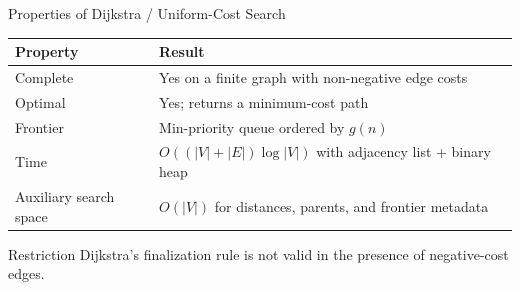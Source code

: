 \documentclass[aspectratio=169,10pt]{beamer}
\begin{document}
\begin{frame}[shrink=20]{Properties of Dijkstra / Uniform-Cost Search}
  \begin{center}
  \renewcommand{\arraystretch}{1.32}
  \begin{tabular}{l|l}
    \textbf{Property} & \textbf{Result} \\\hline
    Complete & Yes on a finite graph with non-negative edge costs \\
    Optimal & Yes; returns a minimum-cost path \\
    Frontier & Min-priority queue ordered by $g(n)$ \\
    Time & $O((|V|+|E|)\log |V|)$ with adjacency list + binary heap \\
    Auxiliary search space & $O(|V|)$ for distances, parents, and frontier metadata
  \end{tabular}
  \end{center}

  \begin{alertblock}{Restriction}
    Dijkstra's finalization rule is not valid in the presence of negative-cost edges.
  \end{alertblock}

\end{frame}
\end{document}
